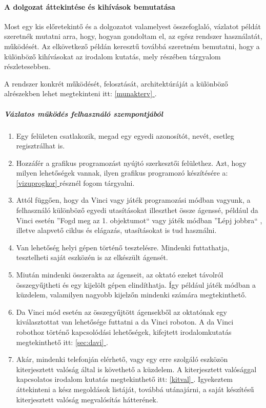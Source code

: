 \documentclass[12pt,a4paper,oneside]{report} %
\newcommand*{\fullref}[1]{\hyperref[{#1}]{\ref*{#1} \nameref*{#1}}} %
\begin{document}
\newpage
\paragraph{A dolgozat áttekintése és kihívások bemutatása}
Most egy kis előretekintő és a dolgozatot valamelyest összefoglaló, vázlatot példát szeretnék mutatni arra, hogy, hogyan gondoltam el, az egész rendszer használatát, működését. Az elkövetkező példán keresztű továbbá szeretném bemutatni, hogy a különböző kihívásokat az irodalom kutatás, mely részében tárgyalom részletesebben.
\par A rendszer konkrét működését, felosztását, architektúráját a különböző alrészekben lehet megtekinteni itt: \fullref{munakterv}.

\subparagraph{Vázlatos működés felhasználó szempontjából}
\begin{enumerate}
	\item Egy felületen csatlakozik, megad egy egyedi azonosítót, nevét, esetleg regisztrálhat is.
	\item Hozzáfér a grafikus programozást nyújtó szerkesztői felülethez. Azt, hogy milyen lehetőségek vannak, ilyen grafikus programozó készítésére a: \fullref{vizuprogkor} résznél fogom tárgyalni.
	\item Attól függően, hogy da Vinci vagy játék programozási módban vagyunk, a felhasználó különböző egyedi utasításokat illeszthet össze ágenssé, például da Vinci esetén ''Fogd meg az 1. objektumot`` vagy játék módban ''Lépj jobbra`` , illetve alapvető ciklus és elágazás, utasításokat is tud használni. 
	\item Van lehetőség helyi gépen történő tesztelésre. Mindenki futtathatja, tesztelheti saját eszközén is az elkészült ágensét.
	\item Miután mindenki összerakta az ágenseit, az oktató ezeket távolról összegyűjtheti és egy kijelölt gépen elindíthatja. Így például játék módban a küzdelem, valamilyen nagyobb kijelzőn  mindenki számára  megtekinthető. 
	\item Da Vinci mód esetén az összegyűjtött ágensekből az oktatónak egy kiválasztottat van lehetősége futtatni a da Vinci roboton. A da Vinci robothoz történő kapcsolódási lehetőségek,  kifejtett irodalomkutatás megtekinthető itt: \fullref{sec:davi}.
	\item Akár, mindenki telefonján elérhető, vagy egy erre szolgáló  eszközön kiterjesztett valóság által is  követhető a küzdelem. A kiterjesztett valósággal kapcsolatos irodalom kutatás megtekinthető itt: \fullref{kitval}. Igyekeztem áttekinteni a kész megoldások listáját, továbbá utánajárni, a saját készítésű kiterjesztett valóság megvalósítás hátterének.
\end{enumerate}
 
\end{document}
